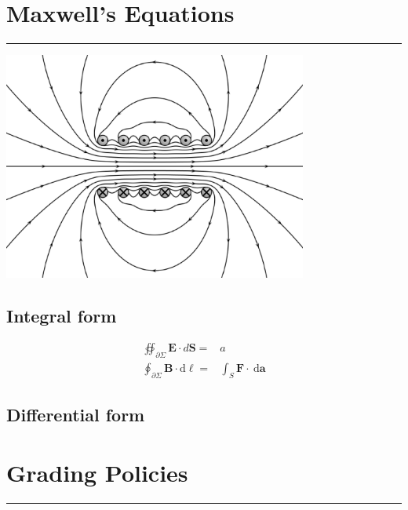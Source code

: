 \documentclass[letterpaper,10pt,fleqn]{article}
\numberwithin{equation}{section}
\newcommand{\D}{\mathrm{d}}
\begin{document}
\newpage

\section*{Maxwell's Equations}
\addtocounter{section}{1}
\hrule
\phantom{A}
\centerline{\includegraphics[width=0.75\textwidth]{maxwell.eps}}

\subsection*{Integral form}

\begin{align}
  \oiint_{\partial\Sigma} \mathbf{E} \cdot d\mathbf{S} =& a \\
  \oint_{\partial\Sigma} \mathbf{B} \cdot \D \ell =& \displaystyle\int_S \mathbf{F} \cdot \ \D \mathbf{a}
\end{align}

\subsection*{Differential form}

\newpage

\section*{Grading Policies}
\hrule
\end{document}
